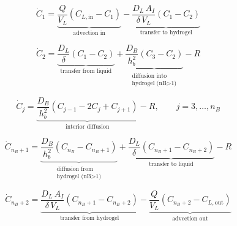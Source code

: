 %
%

\begin{equation}
\dot{C}_{1} =
  \underbrace{\frac{Q}{V_L}\!\left(C_{L,\mathrm{in}} - C_{1}\right)}_{\text{advection in}}
  -\underbrace{\frac{D_L\, A_I}{\delta\, V_L}\!\left(C_{1} - C_{2}\right)}_{\text{transfer to hydrogel}}
\label{eq:liquid_in}
\end{equation}

\begin{equation}
\dot{C}_{2} =
  \underbrace{\frac{D_L}{\delta}\!\left(C_{1} - C_{2}\right)}_{\text{transfer from liquid}}
  +\underbrace{\frac{D_B}{h_b^{2}}\!\left(C_{3} - C_{2}\right)}_{\substack{\text{diffusion into} \\ \text{hydrogel (nB>1)}}}
  - R
\label{eq:hydrogel_first}
\end{equation}

\begin{equation}
\dot{C}_{j} =
  \underbrace{\frac{D_B}{h_b^{2}}\!\left(C_{j-1} - 2C_{j} + C_{j+1}\right)}_{\text{interior diffusion}}
  - R,
  \qquad j = 3,\ldots,n_B
\label{eq:hydrogel_interior}
\end{equation}

\begin{equation}
\dot{C}_{n_B+1} =
  \underbrace{\frac{D_B}{h_b^{2}}\!\left(C_{n_B} - C_{n_B+1}\right)}_{\substack{\text{diffusion from} \\ \text{hydrogel (nB>1)}}}
  +\underbrace{\frac{D_L}{\delta}\!\left(C_{n_B+1} - C_{n_B+2}\right)}_{\text{transfer to liquid}}
  - R
\label{eq:hydrogel_last}
\end{equation}

\begin{equation}
\dot{C}_{n_B+2} =
  \underbrace{\frac{D_L\, A_I}{\delta\, V_L}\!\left(C_{n_B+1} - C_{n_B+2}\right)}_{\text{transfer from hydrogel}}
  -\underbrace{\frac{Q}{V_L}\!\left(C_{n_B+2} - C_{L,\mathrm{out}}\right)}_{\text{advection out}}
\label{eq:liquid_out}
\end{equation}
